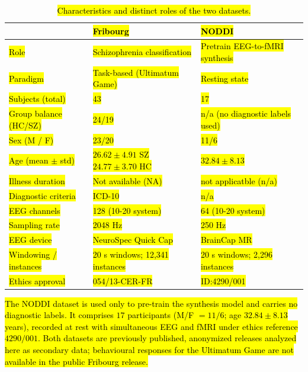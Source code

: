 \documentclass{article}
\begin{document}
\begin{table}[t]
    \centering
    \caption{\hl{Characteristics and distinct roles of the two datasets.}}
    \label{tab:data_description}
    \begin{tabular}{p{3.9cm} | p{4.9cm} | p{5cm} }
        \hline
        \hline
         \hfil & \hfil \hl{Fribourg} & \hfil \hl{NODDI} \\
         \hline
         \hfil \hl{Role} & \hfil \hl{Schizophrenia classification} & \hfil \hl{Pretrain EEG-to-fMRI synthesis}  \\
         \hfil \hl{Paradigm} & \hfil \hl{Task-based (Ultimatum Game)} & \hfil \hl{Resting state} \\
         \hfil \hl{Subjects (total)} & \hfil \hl{43} & \hfil \hl{17} \\
         \hfil \hl{Group balance (HC/SZ)} & \hfil \hl{24/19} & \hfil \hl{n/a (no diagnostic labels used)} \\
         \hfil \hl{Sex (M / F)} & \hfil \hl{23/20} & \hfil \hl{11/6} \\
         \hfil \hl{Age (mean $\pm$ std)} & \hfil \small{\hl{$26.62 \pm 4.91$ SZ $ 24.77 \pm 3.70$ HC}} & \hfil \hl{$32.84 \pm 8.13$} \\
         \hfil \hl{Illness duration} & \hfil \hl{Not available (NA)} & \hfil \hl{not applicatble (n/a)} \\
         \hfil \hl{Diagnostic criteria} & \hfil \hl{ICD-10} & \hfil \hl{n/a} \\
         \hfil \hl{EEG channels} & \hfil \hl{128 (10-20 system)} & \hfil \hl{64 (10-20 system)} \\
         \hfil \hl{Sampling rate} & \hfil \hl{2048 Hz} & \hfil \hl{250 Hz} \\
         \hfil \hl{EEG device} & \hfil \hl{NeuroSpec Quick Cap} & \hfil \hl{BrainCap MR} \\
         \hfil \hl{Windowing / instances} & \hfil \hl{20 s windows; 12,341 instances} & \hfil \hl{20 s windows; 2,296 instances} \\
         \hfil \hl{Ethics approval} & \hfil \hl{054/13-CER-FR} & \hfil \hl{ID:4290/001} \\
         \hline
         \hline
    \end{tabular}
\end{table}

\hl{The NODDI dataset {\cite{dataset_01}} is used only to pre-train the synthesis model and carries no diagnostic labels. It comprises $17$ participants (M/F $= 11/6$; age $32.84 \pm 8.13$ years), recorded at rest with simultaneous EEG and fMRI under ethics reference $4290/001$. Both datasets are previously published, anonymized releases analyzed here as secondary data; behavioural responses for the Ultimatum Game are not available in the public Fribourg release.}
\end{document}
